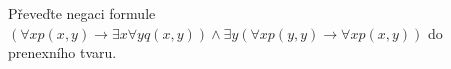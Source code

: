Převeďte negaci formule $(\forall x p(x,y) \rightarrow \exists x \forall y
q(x,y)) \wedge  \exists y (\forall x p(y,y) \rightarrow \forall x p(x,y))$ do
prenexního tvaru.

